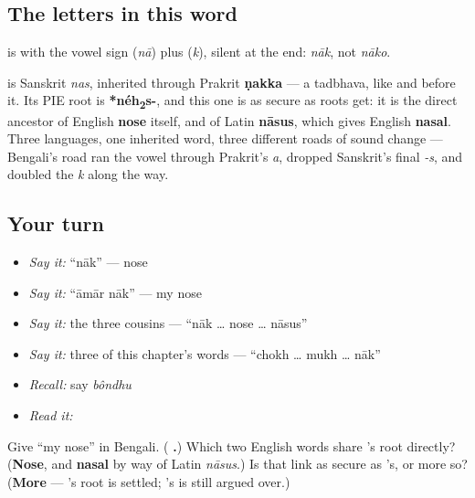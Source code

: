 \subsection*{The letters in this word}
\textbf{} is \textbf{} with the vowel sign \textbf{} (\emph{nā}) plus \textbf{} (\emph{k}), silent at the end: \emph{nāk}, not \emph{nāko}.

\begin{cousinweb}
\textbf{} is Sanskrit \emph{nas}, inherited through Prakrit \textbf{ṇakka} — a tadbhava, like  and  before it. Its PIE root is \textbf{*néh\textsubscript{2}s-}, and this one is as secure as roots get: it is the direct ancestor of English \textbf{nose} itself, and of Latin \textbf{nāsus}, which gives English \textbf{nasal}. Three languages, one inherited word, three different roads of sound change — Bengali's road ran the vowel through Prakrit's \emph{a}, dropped Sanskrit's final \emph{-s}, and doubled the \emph{k} along the way.
\end{cousinweb}

\subsection*{Your turn}
\begin{itemize}
\raggedright
  \item \emph{Say it:} \textquotedblleft{}nāk\textquotedblright{} — nose
  \item \emph{Say it:} \textquotedblleft{}āmār nāk\textquotedblright{} — my nose
  \item \emph{Say it:} the three cousins — \textquotedblleft{}nāk … nose … nāsus\textquotedblright{}
  \item \emph{Say it:} three of this chapter's words — \textquotedblleft{}chokh … mukh … nāk\textquotedblright{}
  \item \emph{Recall:} say \emph{bôndhu}
  \item \emph{Read it:} \textbf{}
\end{itemize}

\begin{tcolorbox}[breakable,colback=teal!4,colframe=teal!35!black,title={Before you move on}]
Give \textquotedblleft{}my nose\textquotedblright{} in Bengali. (\textbf{ .}) Which two English words share 's root directly? (\textbf{Nose}, and \textbf{nasal} by way of Latin \emph{nāsus}.) Is that link as secure as 's, or more so? (\textbf{More} — 's root is settled; 's is still argued over.)
\end{tcolorbox}
